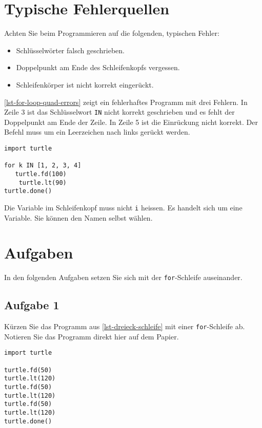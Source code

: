 \section{Typische Fehlerquellen}

Achten Sie beim Programmieren auf die folgenden, typischen Fehler:

\begin{itemize}
	\item Schlüsselwörter falsch geschrieben.
	\item Doppelpunkt am Ende des Schleifenkopfs vergessen.
	\item Schleifenkörper ist nicht korrekt eingerückt.
\end{itemize}
\autoref{lst-for-loop-quad-errors} zeigt ein fehlerhaftes Programm mit drei Fehlern. In Zeile 3 ist das Schlüsselwort \lstinline{IN} nicht korrekt geschrieben und es fehlt der Doppelpunkt am Ende der Zeile. In Zeile \num{5} ist die Einrückung nicht korrekt. Der Befehl muss um ein Leerzeichen nach links gerückt werden.

\begin{lstlisting}[caption={Fehlerhaftes Programm (\graybgtexttt{quadrat\_loop\_fehler.py}).}, label=lst-for-loop-quad-errors]
import turtle

for k IN [1, 2, 3, 4]
   turtle.fd(100)
    turtle.lt(90)
turtle.done()
\end{lstlisting}

\begin{hinweis}
Die Variable im Schleifenkopf muss nicht \lstinline{i} heissen. Es handelt sich um eine  Variable. Sie können den Namen selbst wählen.
\end{hinweis}

\section{Aufgaben}

In den folgenden Aufgaben setzen Sie sich mit der \lstinline{for}-Schleife auseinander.

\subsection{Aufgabe 1}

Kürzen Sie das Programm aus \autoref{lst-dreieck-schleife} mit einer \lstinline{for}-Schleife ab. Notieren Sie das Programm direkt hier auf dem Papier.

\begin{minipage}{0.6\textwidth}
\centering
\fillwithgrid{1.9in}
\end{minipage}
\hfill
\begin{minipage}{0.375\textwidth}
\centering
\begin{lstlisting}[caption={Gleichseitiges Dreieck.}, label=lst-dreieck-schleife]
import turtle

turtle.fd(50)
turtle.lt(120)
turtle.fd(50)
turtle.lt(120)
turtle.fd(50)
turtle.lt(120)
turtle.done()
\end{lstlisting}
\end{minipage}

